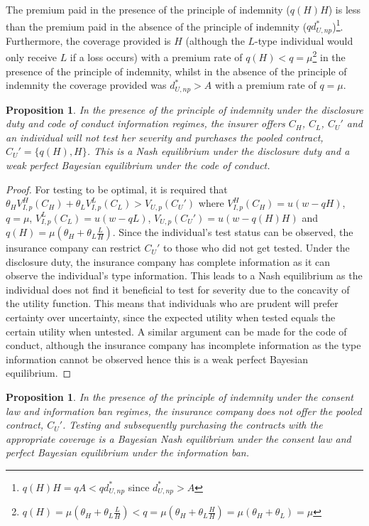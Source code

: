 \documentclass[natbib=false,preprint,12pt]{elsarticle}
\theoremstyle{plain}
\newtheorem{prop}[theorem]{Proposition}
\theoremstyle{definition}
\theoremstyle{plain}
\theoremstyle{TheoremNum}
\theoremstyle{CorollaryNum}
\theoremstyle{PropositionNum}
\theoremstyle{TheoremNum}
\begin{document}
The premium paid in the presence of the principle of indemnity ($q(H) H$) is less than the premium paid in the absence of the principle of indemnity ($q d_{U,np}^*$)\footnote{$q(H) H = q A < q d_{U,np}^*$ since $d_{U,np}^* > A$}. Furthermore, the coverage provided is $H$ (although the $L$-type individual would only receive $L$ if a loss occurs) with a premium rate of $q(H) < q = \mu$\footnote{$q(H) = \mu (\theta_H + \theta_L \frac{L}{H}) < q = \mu (\theta_H + \theta_L \frac{H}{H}) = \mu (\theta_H + \theta_L) = \mu$} in the presence of the principle of indemnity, whilst in the absence of the principle of indemnity the coverage provided was $d_{U,np}^* > A$ with a premium rate of $q=\mu$. 

\setcounter{theorem}{5}
\renewcommand{\thetheorem}{\arabic{theorem}}
\begin{prop}\label{prop:noindemnitytestnoselect}
In the presence of the principle of indemnity under the disclosure duty and code of conduct information regimes, the insurer offers $C_H$, $C_L$, $C_U'$ and an individual will not test her severity and purchases the pooled contract, $C_U'=\{q(H),H\}$. This is a Nash equilibrium under the disclosure duty and a weak perfect Bayesian equilibrium under the code of conduct.
\end{prop}

\begin{proof}
For testing to be optimal, it is required that $\theta_H V_{I,p}^H (C_H) + \theta_L V_{I,p}^L (C_L) > V_{U,p}(C_U')$ where $V_{I,p}^H (C_H) = u(w-qH)$, $q=\mu$, $V_{I,p}^L (C_L) = u(w-qL)$, $ V_{U,p}(C_U') = u(w-q(H)H)$ and $q(H)= \mu(\theta_H + \theta_L \frac{L}{H})$. Since the individual's test status can be observed, the insurance company can restrict $C_U'$ to those who did not get tested. Under the disclosure duty, the insurance company has complete information as it can observe the individual's type information. This leads to a Nash equilibrium as the individual does not find it beneficial to test for severity due to the concavity of the utility function. This means that individuals who are prudent will prefer certainty over uncertainty, since the expected utility when tested equals the certain utility when untested. A similar argument can be made for the code of conduct, although the insurance company has incomplete information as the type information cannot be observed hence this is a weak perfect Bayesian equilibrium.
\end{proof}

\begin{prop}
In the presence of the principle of indemnity under the consent law and information ban regimes, the insurance company does not offer the pooled contract, $C_U'$. Testing and subsequently purchasing the contracts with the appropriate coverage is a Bayesian Nash equilibrium under the consent law and perfect Bayesian equilibrium under the information ban.
\end{prop}
\end{document}
